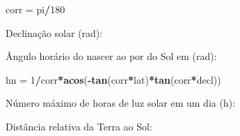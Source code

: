 \documentclass[
]{book}
\newenvironment{Shaded}{\begin{snugshade}}{\end{snugshade}}
\newcommand{\DecValTok}[1]{\textcolor[rgb]{0.00,0.00,0.81}{#1}}
\newcommand{\FloatTok}[1]{\textcolor[rgb]{0.00,0.00,0.81}{#1}}
\newcommand{\KeywordTok}[1]{\textcolor[rgb]{0.13,0.29,0.53}{\textbf{#1}}}
\newcommand{\NormalTok}[1]{#1}
\newcommand{\OperatorTok}[1]{\textcolor[rgb]{0.81,0.36,0.00}{\textbf{#1}}}
\newcommand{\StringTok}[1]{\textcolor[rgb]{0.31,0.60,0.02}{#1}}
\begin{document}
\begin{Shaded}
\begin{Highlighting}[]
\NormalTok{corr =}\StringTok{ }\NormalTok{pi}\OperatorTok{/}\DecValTok{180} 
\end{Highlighting}
\end{Shaded}

Declinação solar (rad):

\begin{Shaded}
\end{Shaded}

Ângulo horário do nascer ao por do Sol em (rad):

\begin{Shaded}
\begin{Highlighting}[]
\NormalTok{hn =}\StringTok{ }\DecValTok{1}\OperatorTok{/}\NormalTok{corr}\OperatorTok{*}\KeywordTok{acos}\NormalTok{(}\OperatorTok{-}\KeywordTok{tan}\NormalTok{(corr}\OperatorTok{*}\NormalTok{lat)}\OperatorTok{*}\KeywordTok{tan}\NormalTok{(corr}\OperatorTok{*}\NormalTok{decl)) }
\end{Highlighting}
\end{Shaded}

Número máximo de horas de luz solar em um dia (h):

\begin{Shaded}
\end{Shaded}

Distância relativa da Terra ao Sol:

\begin{Shaded}
\end{Shaded}
\end{document}
